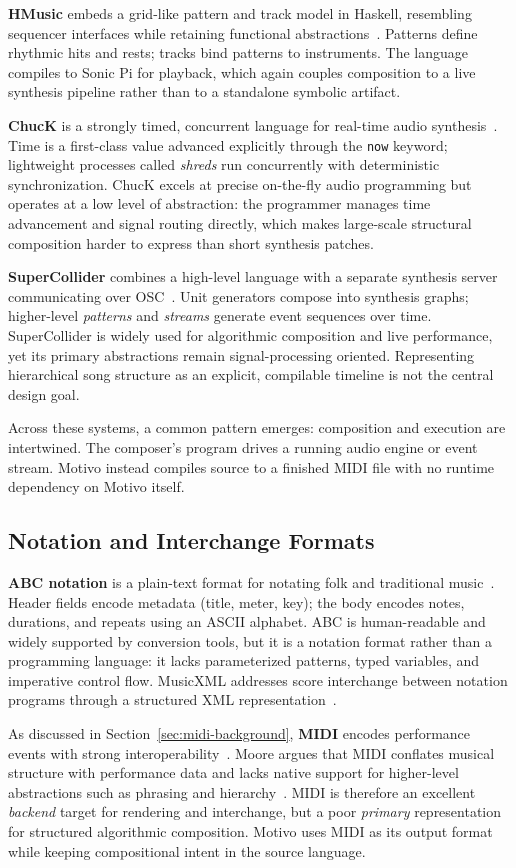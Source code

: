 \textbf{HMusic} embeds a grid-like pattern and track model in Haskell, resembling sequencer interfaces while retaining
functional abstractions~\cite{Du_Bois_Ribeiro_2019}.
Patterns define rhythmic hits and rests; tracks bind patterns to instruments.
The language compiles to Sonic Pi for playback, which again couples composition to a live synthesis pipeline rather
than to a standalone symbolic artifact.

\textbf{ChucK} is a strongly timed, concurrent language for real-time audio synthesis~\cite{Wang_Cook_2003,Wang_2008}.
Time is a first-class value advanced explicitly through the \texttt{now} keyword; lightweight processes called
\textit{shreds} run concurrently with deterministic synchronization.
ChucK excels at precise on-the-fly audio programming but operates at a low level of abstraction: the programmer
manages time advancement and signal routing directly, which makes large-scale structural composition harder to express
than short synthesis patches.

\textbf{SuperCollider} combines a high-level language with a separate synthesis server communicating over
OSC~\cite{McCartney_2002,Wilson_Cottle_Collins_2011}.
Unit generators compose into synthesis graphs; higher-level \textit{patterns} and \textit{streams} generate event
sequences over time.
SuperCollider is widely used for algorithmic composition and live performance, yet its primary abstractions remain
signal-processing oriented.
Representing hierarchical song structure as an explicit, compilable timeline is not the central design goal.

Across these systems, a common pattern emerges: composition and execution are intertwined.
The composer's program drives a running audio engine or event stream.
Motivo instead compiles source to a finished MIDI file with no runtime dependency on Motivo itself.

\subsection{Notation and Interchange Formats}\label{subsec:notation-related}

\textbf{ABC notation} is a plain-text format for notating folk and traditional music~\cite{Walshaw_2011}.
Header fields encode metadata (title, meter, key); the body encodes notes, durations, and repeats using an ASCII
alphabet.
ABC is human-readable and widely supported by conversion tools, but it is a notation format rather than a programming
language: it lacks parameterized patterns, typed variables, and imperative control flow.
MusicXML addresses score interchange between notation programs through a structured XML representation~\cite{Good_2001}.

As discussed in Section~\ref{sec:midi-background}, \textbf{MIDI} encodes performance events with strong
interoperability~\cite{Moog_1986}.
Moore argues that MIDI conflates musical structure with performance data and lacks native support for higher-level
abstractions such as phrasing and hierarchy~\cite{Moore_1988}.
MIDI is therefore an excellent \textit{backend} target for rendering and interchange, but a poor \textit{primary}
representation for structured algorithmic composition.
Motivo uses MIDI as its output format while keeping compositional intent in the source language.
